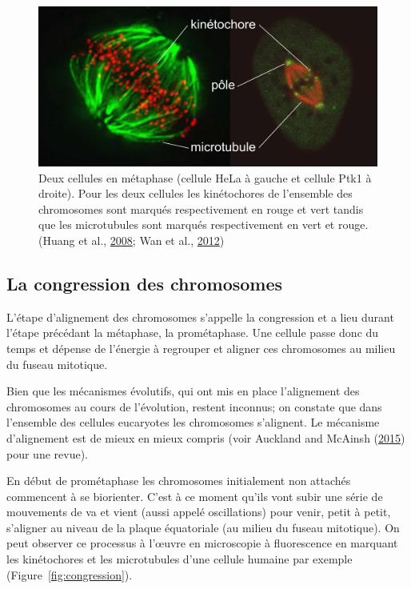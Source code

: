 \documentclass[12pt,a4paper,twoside,openright]{book}
\begin{document}
\begin{figure}[htbp]
\centering
\includegraphics{figures/intro/spindle_micro.png}
\caption[Deux types de cellules différentes en métaphase]{\label{fig:spindle_micro}Deux
cellules en métaphase (cellule HeLa à gauche et cellule Ptk1 à droite).
Pour les deux cellules les kinétochores de l'ensemble des chromosomes
sont marqués respectivement en rouge et vert tandis que les microtubules
sont marqués respectivement en vert et rouge. (Huang et al.,
\hyperref[ref-Huang2008]{2008}; Wan et al.,
\hyperref[ref-Wan2012]{2012})}
\end{figure}

\subsection{La congression des
chromosomes}\label{la-congression-des-chromosomes}

L'étape d'alignement des chromosomes s'appelle la congression et a lieu
durant l'étape précédant la métaphase, la prométaphase. Une cellule
passe donc du temps et dépense de l'énergie à regrouper et aligner ces
chromosomes au milieu du fuseau mitotique.

Bien que les mécanismes évolutifs, qui ont mis en place l'alignement des
chromosomes au cours de l'évolution, restent inconnus; on constate que
dans l'ensemble des cellules eucaryotes les chromosomes s'alignent. Le
mécanisme d'alignement est de mieux en mieux compris (voir Auckland and
McAinsh (\hyperref[ref-Auckland2015a]{2015}) pour une revue).

En début de prométaphase les chromosomes initialement non attachés
commencent à se biorienter. C'est à ce moment qu'ils vont subir une
série de mouvements de va et vient (aussi appelé oscillations) pour
venir, petit à petit, s'aligner au niveau de la plaque équatoriale (au
milieu du fuseau mitotique). On peut observer ce processus à l'œuvre en
microscopie à fluorescence en marquant les kinétochores et les
microtubules d'une cellule humaine par exemple
(Figure~\ref{fig:congression}).
\end{document}
